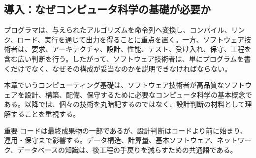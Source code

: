 \subsection{導入：なぜコンピュータ科学の基礎が必要か}

プログラマは、与えられたアルゴリズムを命令列へ変換し、コンパイル、リンク、ロード、実行を通じて出力を得ることに重点を置く。一方、ソフトウェア技術者は、要求、アーキテクチャ、設計、性能、テスト、受け入れ、保守、工程を含む広い判断を行う。したがって、ソフトウェア技術者は、単にプログラムを書くだけでなく、なぜその構成が妥当なのかを説明できなければならない。

本章でいうコンピューティング基礎は、ソフトウェア技術者が高品質なソフトウェアを設計、構築、配備、保守するために必要なコンピュータ科学の基本概念である。以降では、個々の技術を丸暗記するのではなく、設計判断の材料として理解することを重視する。

\begin{pointbox}{重要}
コードは最終成果物の一部であるが、設計判断はコードより前に始まり、運用・保守まで影響する。データ構造、計算量、基本ソフトウェア、ネットワーク、データベースの知識は、後工程の手戻りを減らすための共通語である。

\end{pointbox}
